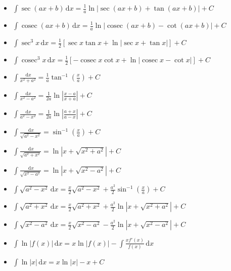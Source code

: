 \documentclass[11pt,a4paper,fleqn]{article}
\newcommand{\dd}{\,\mathrm{d}}
\newcommand{\cosec}{\operatorname{cosec}}
\newenvironment{integrallist}
  {\begin{itemize}[
      label=\(\bullet\),
      leftmargin=1.65em,
      labelsep=0.55em,
      itemsep=0.55em,
      topsep=0.15em,
      parsep=0pt,
      partopsep=0pt
    ]}
  {\end{itemize}}
\begin{document}
\begin{integrallist}
\item \(\displaystyle
      \int \sec(ax+b)\dd x
      =\frac{1}{a}\ln|\sec(ax+b)+\tan(ax+b)|+C\)
\item \(\displaystyle
      \int \cosec(ax+b)\dd x
      =\frac{1}{a}\ln|\cosec(ax+b)-\cot(ax+b)|+C\)
\item \(\displaystyle
      \int \sec^3x\dd x
      =\frac{1}{2}\left[\sec x\tan x
      +\ln|\sec x+\tan x|\right]+C\)
\item \(\displaystyle
      \int \cosec^3x\dd x
      =\frac{1}{2}\left[-\cosec x\cot x
      +\ln|\cosec x-\cot x|\right]+C\)
\end{integrallist}

\begin{integrallist}
\item \(\displaystyle
      \int \frac{\dd x}{x^2+a^2}
      =\frac{1}{a}\tan^{-1}\!\left(\frac{x}{a}\right)+C\)
\item \(\displaystyle
      \int \frac{\dd x}{x^2-a^2}
      =\frac{1}{2a}\ln\left|\frac{x-a}{x+a}\right|+C\)
\item \(\displaystyle
      \int \frac{\dd x}{a^2-x^2}
      =\frac{1}{2a}\ln\left|\frac{a+x}{a-x}\right|+C\)
\item \(\displaystyle
      \int \frac{\dd x}{\sqrt{a^2-x^2}}
      =\sin^{-1}\!\left(\frac{x}{a}\right)+C\)
\item \(\displaystyle
      \int \frac{\dd x}{\sqrt{a^2+x^2}}
      =\ln\left|x+\sqrt{x^2+a^2}\right|+C\)
\item \(\displaystyle
      \int \frac{\dd x}{\sqrt{x^2-a^2}}
      =\ln\left|x+\sqrt{x^2-a^2}\right|+C\)
\item \(\displaystyle
      \int \sqrt{a^2-x^2}\dd x
      =\frac{x}{2}\sqrt{a^2-x^2}
      +\frac{a^2}{2}\sin^{-1}\!\left(\frac{x}{a}\right)+C\)
\item \(\displaystyle
      \int \sqrt{a^2+x^2}\dd x
      =\frac{x}{2}\sqrt{a^2+x^2}
      +\frac{a^2}{2}\ln\left|x+\sqrt{x^2+a^2}\right|+C\)
\item \(\displaystyle
      \int \sqrt{x^2-a^2}\dd x
      =\frac{x}{2}\sqrt{x^2-a^2}
      -\frac{a^2}{2}\ln\left|x+\sqrt{x^2-a^2}\right|+C\)
\item \(\displaystyle
      \int \ln|f(x)|\dd x
      =x\ln|f(x)|-\int\frac{x f'(x)}{f(x)}\dd x\)
\item \(\displaystyle
      \int \ln|x|\dd x=x\ln|x|-x+C\)
\end{integrallist}
\end{document}
